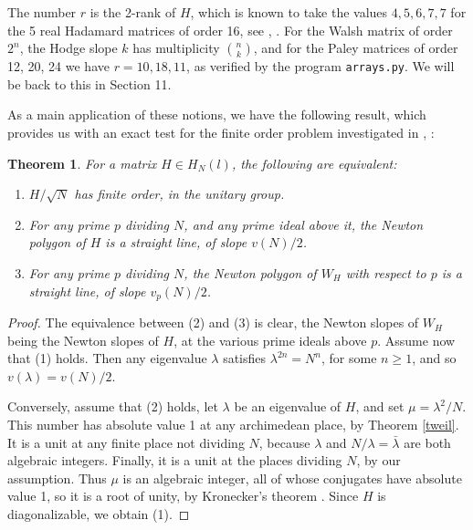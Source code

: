 \documentclass[11pt]{amsart}
\newtheorem{theorem}{Theorem}[section]
\theoremstyle{definition}
\begin{document}
The number $r$ is the 2-rank of $H$, which is known to take the values $4,5,6,7,7$ for the 5 real Hadamard matrices of order 16, see \cite{obo}, \cite{wwa}. For the Walsh matrix of order $2^n$, the Hodge slope $k$ has multiplicity $\binom{n}{k}$, and for the Paley matrices of order 12, 20, 24 we have $r=10,18,11$, as verified by the program \texttt{arrays.py}. We will be back to this in Section 11.

\medskip

As a main application of these notions, we have the following result, which provides us with an exact test for the finite order problem investigated in \cite{eoc}, \cite{eos}:

\begin{theorem}\label{tfin}
For a matrix $H\in H_N(l)$, the following are equivalent:
\begin{enumerate}
\item $H/\sqrt{N}$ has finite order, in the unitary group.

\item For any prime $p$ dividing $N$, and any prime ideal above it, the Newton polygon of $H$ is a straight line, of slope $v(N)/2$.

\item For any prime $p$ dividing $N$, the Newton polygon of $W_H$ with respect to $p$ is a straight line, of slope $v_p(N)/2$.
\end{enumerate}
\end{theorem}

\begin{proof}
The equivalence between (2) and (3) is clear, the Newton slopes of $W_H$ being the Newton slopes of $H$, at the various prime ideals above $p$. Assume now that (1) holds. Then any eigenvalue $\lambda$ satisfies $\lambda^{2n}=N^n$, for some $n\geq1$, and so $v(\lambda)=v(N)/2$.

\medskip

Conversely, assume that (2) holds, let $\lambda$ be an eigenvalue of $H$, and set $\mu=\lambda^2/N$. This number has absolute value 1 at any archimedean place, by Theorem \ref{tweil}. It is a unit at any finite place not dividing $N$, because $\lambda$ and $N/\lambda=\bar{\lambda}$ are both algebraic integers. Finally, it is a unit at the places dividing $N$, by our assumption. Thus $\mu$ is an algebraic integer, all of whose conjugates have absolute value 1, so it is a root of unity, by Kronecker's theorem \cite{kro}. Since $H$ is diagonalizable, we obtain (1).
\end{proof}
\end{document}

